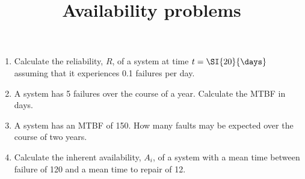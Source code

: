 \documentclass{pgnotes}
\title{Availability problems}
\begin{document}
\maketitle

\begin{enumerate}

\item Calculate the reliability, $R$, of a system at time $t=\SI{20}{\days}$ assuming that it experiences 0.1 failures per day. %

\item A system has 5 failures over the course of a year. Calculate the MTBF in days. %

\item A system has an MTBF of \SI{150}{\days}. How many faults may be expected over the course of two years. %

\item Calculate the inherent availability, $A_i$, of a system with a mean time between failure of \SI{120}{\days} and a mean time to repair of \SI{12}{\hours}. %

\end{enumerate}
\end{document}
